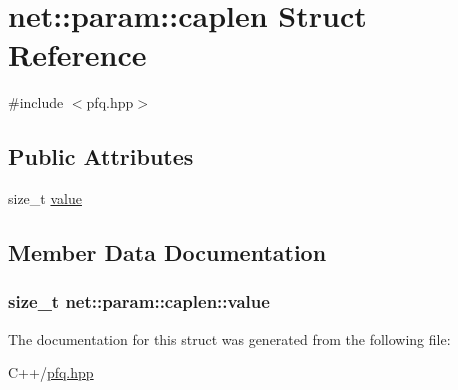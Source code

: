 \hypertarget{structnet_1_1param_1_1caplen}{\section{net\+:\+:param\+:\+:caplen Struct Reference}
\label{structnet_1_1param_1_1caplen}
}


{\ttfamily \#include $<$pfq.\+hpp$>$}

\subsection*{Public Attributes}
\begin{DoxyCompactItemize}
\item 
size\+\_\+t \hyperlink{structnet_1_1param_1_1caplen_a48064660e860d24789528b4651528d58}{value}
\end{DoxyCompactItemize}


\subsection{Member Data Documentation}
\hypertarget{structnet_1_1param_1_1caplen_a48064660e860d24789528b4651528d58}{
\subsubsection[{value}]{\setlength{\rightskip}{0pt plus 5cm}size\+\_\+t net\+::param\+::caplen\+::value}}\label{structnet_1_1param_1_1caplen_a48064660e860d24789528b4651528d58}


The documentation for this struct was generated from the following file\+:\begin{DoxyCompactItemize}
\item 
C++/\hyperlink{pfq_8hpp}{pfq.\+hpp}\end{DoxyCompactItemize}
